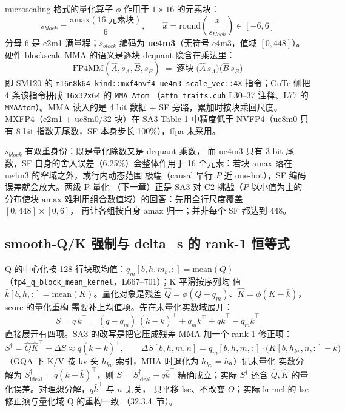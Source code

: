 microscaling 格式的量化算子 $\phi$ 作用于 $1\times16$ 的元素块：
\begin{equation}
  s_{block}=\frac{\mathrm{amax}(16\text{ 元素块})}{6},\qquad
  \hat x=\mathrm{round}\!\left(\frac{x}{s_{block}}\right)\in[-6,6]
  \label{eq:31-nvfp4-block}
\end{equation}
分母 6 是 e2m1 满量程；$s_{block}$ 编码为 \textbf{ue4m3}（无符号
e4m3，值域 $[0,448]$）。硬件 blockscale MMA 的语义是逐块
dequant 隐含在乘法里：
\begin{equation}
  \mathrm{FP4MM}(\hat A,s_A,\hat B,s_B)
  \;=\;\text{逐块}\;\bigl(\hat A\,s_A\bigr)\bigl(\hat B\,s_B\bigr)
  \label{eq:31-blockscale}
\end{equation}
即 SM120 的 \texttt{m16n8k64 kind::mxf4nvf4 ue4m3 scale\_vec::4X}
指令；CuTe 侧把 4 条该指令拼成 \texttt{16x32x64} 的 \texttt{MMA\_Atom}
（\texttt{attn\_traits.cuh} L30--37 注释、L77 的 \texttt{MMAAtom}）。MMA 读入的是 4 bit 数据 +
SF 旁路，累加时按块乘回尺度。MXFP4（e2m1 + ue8m0/32 块）在 SA3
Table 1 中精度低于 NVFP4（ue8m0 只有 8 bit 指数无尾数，SF 本身步长
100\%），ffpa 未采用。

$s_{block}$ 有双重身份：既是量化除数又是 dequant 乘数，
而 ue4m3 只有 3 bit 尾数，SF 自身的舍入误差（6.25\%）会整体作用于
16 个元素：若块 $\mathrm{amax}$ 落在 ue4m3 的窄域之外，或行内动态范围
极端（causal 早行 $P$ 近 one-hot），SF 编码误差就会放大。两级 P 量化
（下一章）正是 SA3 对 C2 挑战（$P$ 以小值为主的分布使块
$\mathrm{amax}$ 难利用组合数值域）的回答：先用全行尺度覆盖 $[0,448]\times[0,6]$，
再让各组按自身 $\mathrm{amax}$ 归一；并非每个 SF 都达到 448。

\subsection{smooth-Q/K 强制与 delta\_s 的 rank-1 恒等式}

Q 的中心化按 128 行块取均值：$q_m[b,h,m_b,:]=\mathrm{mean}(Q)$
（\texttt{fp4\_q\_block\_mean\_kernel}，L667--701）；K 平滑按序列均
值 $\bar k[b,h,:]=\mathrm{mean}(K)$。量化对象是残差
$\hat Q=\phi(Q-q_m)$、$\hat K=\phi(K-\bar k)$，score 的量化重构
需要补上均值项。先在未量化实数域展开：
\begin{equation}
  S=q\,k^\top=(q-q_m)\,(k-\bar k)^\top+q_m k^\top+q\bar k^\top
  -q_m\bar k^\top
\end{equation}
直接展开有四项。SA3 的改写是把它压成残差 MMA 加一个 rank-1 修正项：
\begin{equation}
  S^{\dagger}=\hat Q\hat K^\top+\Delta S\approx q(k-\bar k)^\top,\qquad
  \Delta S[b,h,m,n]=q_m[b,h,m,:]\cdot\bigl(K[b,h_{kv},n,:]-\bar k\bigr)
  \label{eq:31-deltas}
\end{equation}
（GQA 下 K/V 按 kv 头 $h_{kv}$ 索引，MHA 时退化为 $h_{kv}=h$。）记未量化
实数分解为 $S^{\dagger}_{\mathrm{ideal}}=q(k-\bar k)^\top$，则
$S=S^{\dagger}_{\mathrm{ideal}}+q\bar k^\top$ 精确成立；实际 $S^\dagger$
还含 $\hat Q,\hat K$ 的量化误差。对理想分解，$q\bar k^\top$ 与 $n$ 无关，
只平移 lse、不改变 $O$；实际 kernel 的 lse 修正须与量化域 Q 的重构一致
（32.3.4~节）。

